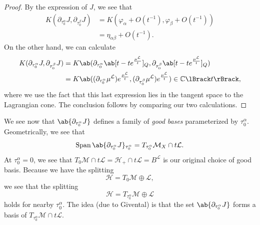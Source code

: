\documentclass[article,10pt,oneside,oldfontcommands]{memoir}
\theoremstyle{definition}
\theoremstyle{remark}
\theoremstyle{plain}
\theoremstyle{definition}
\theoremstyle{remark}
\newcommand{\C}{\mathbb{C}}
\newcommand{\mc}[1]{\mathcal{#1}}
\newcommand{\on}[1]{\operatorname{#1}}
\newcommand{\1}{\mathbf{1}}
\newcommand{\2}{\mathbf{2}}
\newcommand{\3}{\mathbf{3}}
\newcommand{\ps}[1]{\lBrack #1 \rBrack}
\begin{document}
\begin{proof}
    By the expression of \(J\), we see that
    \begin{align*}
        K(\partial_{\tau_0^{\alpha}} J, \partial_{\tau_0^{\beta}} J) &= K (\varphi_{\alpha} + O(t^{-1}), \varphi_{\beta} + O(t^{-1})) \\
        &= \eta_{\alpha \beta} + O(t^{-1}).
    \end{align*}
    On the other hand, we can calculate
    \begin{align*}
        K(\partial_{\tau_0^{\alpha}} J, \partial_{\tau_0^{\beta}} J) &= K \ab( \partial_{\tau_0^{\alpha}}\ab[t - t e^{\frac{\mu^{\mc{L}}}{t}}]_Q, \partial_{\tau_0^{\beta}}\ab[t - t e^{\frac{\mu^{\mc{L}}}{t}}]_Q ) \\
        &= K \ab( (\partial_{\tau_0^{\alpha}} \mu^{\mc{L}}) e^{\frac{\mu^{\mc{L}}}{t}}, (\partial_{\tau_0^{\beta}} \mu^{\mc{L}}) e^{\frac{\mu^{\mc{L}}}{t}} ) \in \C\ps{t},
    \end{align*}
    where we use the fact that this last expression lies in the tangent space to the Lagrangian cone. The conclusion follows by comparing our two calculations.
\end{proof}

We see now that \(\ab\{ \partial_{\tau_0^{\alpha}} J\}\) defines a family of \textit{good bases} parameterized by \(\tau_0^{\alpha}\). Geometrically, we see that
\[ \on{Span} \ab\{ \partial_{\tau_0^{\alpha}} J \}_{\tau_0^{\alpha}} = T_{\tau_0^{\alpha}} \mc{M}_X \cap t \mc{L}. \]
At \(\tau_0^{\alpha} = 0\), we see that \(T_0 \mc{M} \cap t \mc{L} = \mc{H}_+ \cap t \mc{L} = B^{\mc{L}}\) is our original choice of good basis. Because we have the splitting
\[ \mc{H} = T_0 \mc{M} \oplus \mc{L}, \]
we see that the splitting
\[ \mc{H} = T_{\tau_0^{\alpha}} \mc{M} \oplus \mc{L} \]
holds for nearby \(\tau_0^{\alpha}\). The idea (due to Givental) is that the set \(\ab\{ \partial_{\tau_0^{\alpha}} J\}\) forms a basis of \(T_{\tau_0^{\alpha}} \mc{M} \cap t \mc{L}\).
\end{document}

